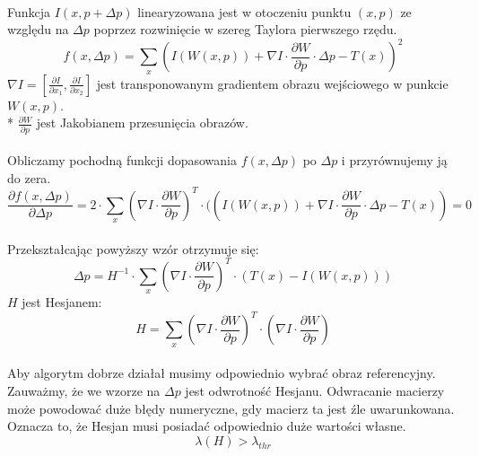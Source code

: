 \paragraph*{}
Funkcja \(I(x,p+\Delta p)\) linearyzowana jest w otoczeniu punktu \((x,p)\) ze względu na \(\Delta p\) poprzez rozwinięcie w szereg Taylora pierwszego rzędu.
\begin{equation}
f(x,\Delta p)=\sum\limits_{x}(I(W(x,p))+\nabla I \cdot \frac{\partial W}{\partial p} \cdot \Delta p-T(x))^2
\end{equation}
\(\nabla I=[\frac{\partial I}{\partial x_1}, \frac{\partial I}{\partial x_2}]\) jest transponowanym gradientem obrazu wejściowego w punkcie \(W(x,p)\).\\*
\(\frac{\partial W}{\partial p}\) jest Jakobianem przesunięcia obrazów.
\paragraph*{}
Obliczamy pochodną funkcji dopasowania \(f(x,\Delta p)\) po \(\Delta p\) i przyrównujemy ją do zera.
\begin{equation}
\frac{\partial f(x,\Delta p)}{\partial \Delta p}=2 \cdot \sum\limits_{x} (\nabla I \cdot \frac{\partial W}{\partial p})^T \cdot ((I(W(x,p))+\nabla I \cdot \frac{\partial W}{\partial p} \cdot \Delta p-T(x))=0
\end{equation}
\paragraph*{}
Przekształcając powyższy wzór otrzymuje się:
\begin{equation}
\Delta p=H^{-1} \cdot \sum\limits_{x}(\nabla I \cdot \frac{\partial W}{\partial p})^T \cdot (T(x)-I(W(x,p)))
\end{equation}
\(H\) jest Hesjanem:
\begin{equation}
H=\sum\limits_{x}(\nabla I \cdot \frac{\partial W}{\partial p})^T \cdot (\nabla I \cdot \frac{\partial W}{\partial p})
\end{equation}
\paragraph*{}
Aby algorytm dobrze działał musimy odpowiednio wybrać obraz referencyjny. Zauważmy, że we wzorze na \(\Delta p\) jest odwrotność Hesjanu. Odwracanie macierzy może powodować duże błędy numeryczne, gdy macierz ta jest źle uwarunkowana. Oznacza to, że Hesjan musi posiadać odpowiednio duże wartości własne.
\begin{equation}
\lambda(H)>\lambda_{thr}
\end{equation}
